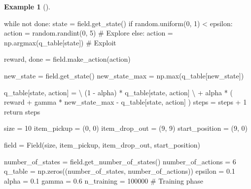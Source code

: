 \documentclass[
  letterpaper,
]{krantz}
\makeatletter
\newenvironment{Shaded}{\begin{snugshade}}{\end{snugshade}}
\newcommand{\BuiltInTok}[1]{\textcolor[rgb]{0.00,0.23,0.31}{#1}}
\newcommand{\CommentTok}[1]{\textcolor[rgb]{0.37,0.37,0.37}{#1}}
\newcommand{\ControlFlowTok}[1]{\textcolor[rgb]{0.00,0.23,0.31}{#1}}
\newcommand{\DecValTok}[1]{\textcolor[rgb]{0.68,0.00,0.00}{#1}}
\newcommand{\FloatTok}[1]{\textcolor[rgb]{0.68,0.00,0.00}{#1}}
\newcommand{\KeywordTok}[1]{\textcolor[rgb]{0.00,0.23,0.31}{#1}}
\newcommand{\NormalTok}[1]{\textcolor[rgb]{0.00,0.23,0.31}{#1}}
\newcommand{\OperatorTok}[1]{\textcolor[rgb]{0.37,0.37,0.37}{#1}}
\newenvironment{kframe}{%
\medskip{}
\setlength{\fboxsep}{.8em}
 \def\at@end@of@kframe{}%
 \ifinner\ifhmode%
  \def\at@end@of@kframe{\end{minipage}}%
  \begin{minipage}{\columnwidth}%
 \fi\fi%
 \def\FrameCommand##1{\hskip\@totalleftmargin \hskip-\fboxsep
 \colorbox{shadecolor}{##1}\hskip-\fboxsep
     \hskip-\linewidth \hskip-\@totalleftmargin \hskip\columnwidth}%
 \MakeFramed {\advance\hsize-\width
   \@totalleftmargin\z@ \linewidth\hsize
   \@setminipage}}%
 {\par\unskip\endMakeFramed%
 \at@end@of@kframe}
\renewenvironment{Shaded}{\begin{kframe}}{\end{kframe}}
\theoremstyle{plain}
\theoremstyle{definition}
\newtheorem{example}{Example}[chapter]
\theoremstyle{definition}
\theoremstyle{remark}
\makeatother
\begin{document}
\begin{example}[]
\begin{tcolorbox}[enhanced jigsaw, bottomrule=.15mm, opacityback=0, breakable, colframe=quarto-callout-tip-color-frame, left=2mm, rightrule=.15mm, toprule=.15mm, leftrule=.75mm, arc=.35mm, colback=white]
\begin{codelisting}[H]
\begin{Shaded}
\begin{Highlighting}[]
    \ControlFlowTok{while} \KeywordTok{not}\NormalTok{ done:}
\NormalTok{        state }\OperatorTok{=}\NormalTok{ field.get\_state()}
        \ControlFlowTok{if}\NormalTok{ random.uniform(}\DecValTok{0}\NormalTok{, }\DecValTok{1}\NormalTok{) }\OperatorTok{\textless{}}\NormalTok{ epsilon:}
\NormalTok{            action }\OperatorTok{=}\NormalTok{ random.randint(}\DecValTok{0}\NormalTok{, }\DecValTok{5}\NormalTok{)  }\CommentTok{\# Explore}
        \ControlFlowTok{else}\NormalTok{:}
\NormalTok{            action }\OperatorTok{=}\NormalTok{ np.argmax(q\_table[state])  }\CommentTok{\# Exploit}
        
\NormalTok{        reward, done }\OperatorTok{=}\NormalTok{ field.make\_action(action)}
        
\NormalTok{        new\_state }\OperatorTok{=}\NormalTok{ field.get\_state()}
\NormalTok{        new\_state\_max }\OperatorTok{=}\NormalTok{ np.}\BuiltInTok{max}\NormalTok{(q\_table[new\_state])}
        
\NormalTok{        q\_table[state, action] }\OperatorTok{=} \OperatorTok{\textbackslash{}}
\NormalTok{            (}\DecValTok{1} \OperatorTok{{-}}\NormalTok{ alpha) }\OperatorTok{*}\NormalTok{ q\_table[state, action] }\OperatorTok{\textbackslash{}}
            \OperatorTok{+}\NormalTok{ alpha }\OperatorTok{*}\NormalTok{ (}
\NormalTok{                    reward }\OperatorTok{+}\NormalTok{ gamma }\OperatorTok{*}\NormalTok{ new\_state\_max}
                    \OperatorTok{{-}}\NormalTok{ q\_table[state, action]}
\NormalTok{            )}
\NormalTok{        steps }\OperatorTok{=}\NormalTok{ steps }\OperatorTok{+} \DecValTok{1}
    \ControlFlowTok{return}\NormalTok{ steps}


\NormalTok{size }\OperatorTok{=} \DecValTok{10}
\NormalTok{item\_pickup }\OperatorTok{=}\NormalTok{ (}\DecValTok{0}\NormalTok{, }\DecValTok{0}\NormalTok{)}
\NormalTok{item\_drop\_out }\OperatorTok{=}\NormalTok{ (}\DecValTok{9}\NormalTok{, }\DecValTok{9}\NormalTok{)}
\NormalTok{start\_position }\OperatorTok{=}\NormalTok{ (}\DecValTok{9}\NormalTok{, }\DecValTok{0}\NormalTok{)}

\NormalTok{field }\OperatorTok{=}\NormalTok{ Field(size, item\_pickup, item\_drop\_out, start\_position)}

\NormalTok{number\_of\_states }\OperatorTok{=}\NormalTok{ field.get\_number\_of\_states()}
\NormalTok{number\_of\_actions }\OperatorTok{=} \DecValTok{6}
\NormalTok{q\_table }\OperatorTok{=}\NormalTok{ np.zeros((number\_of\_states, number\_of\_actions))}
\NormalTok{epsilon }\OperatorTok{=} \FloatTok{0.1}
\NormalTok{alpha }\OperatorTok{=} \FloatTok{0.1}
\NormalTok{gamma }\OperatorTok{=} \FloatTok{0.6}
\NormalTok{n\_training }\OperatorTok{=} \DecValTok{100000}
\CommentTok{\# Training phase}


\end{Highlighting}
\end{Shaded}
\end{codelisting}
\end{tcolorbox}
\end{example}
\end{document}

